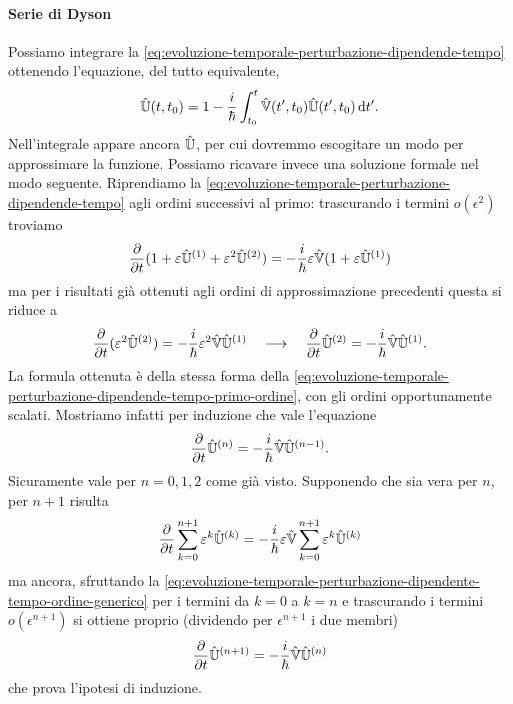 \paragraph{Serie di Dyson}
Possiamo integrare la \eqref{eq:evoluzione-temporale-perturbazione-dipendende-tempo} ottenendo l'equazione, del tutto equivalente,
\begin{equation}
	\hat{\mathbb U}(t,t_0)=1-\frac{i}{\hbar}\int_{t_0}^t\hat{\mathbb V}(t',t_0)\hat{\mathbb U}(t',t_0)\,\textup{d} t'.
	\label{eq:evoluzione-temporale-perturbazione-dipendente-tempo-integrata}
\end{equation}
Nell'integrale appare ancora $\hat{\mathbb U}$, per cui dovremmo escogitare un modo per approssimare la funzione.
Possiamo ricavare invece una soluzione formale nel modo seguente.
Riprendiamo la \eqref{eq:evoluzione-temporale-perturbazione-dipendende-tempo} agli ordini successivi al primo: trascurando i termini $o(\epsilon^2)$ troviamo
\begin{equation}
	\frac{\partial {}}{\partial {t}}(1+\varepsilon\hat{\mathbb U}^{(1)}+\varepsilon^2\hat{\mathbb U}^{(2)})=-\frac{i}{\hbar}\varepsilon\hat{\mathbb V}(1+\varepsilon\hat{\mathbb U}^{(1)})
\end{equation}
ma per i risultati già ottenuti agli ordini di approssimazione precedenti questa si riduce a
\begin{equation}
	\frac{\partial {}}{\partial {t}}(\varepsilon^2\hat{\mathbb U}^{(2)})=-\frac{i}{\hbar}\varepsilon^2\hat{\mathbb V}\hat{\mathbb U}^{(1)}
	\quad\longrightarrow\quad
	\frac{\partial {}}{\partial {t}}\hat{\mathbb U}^{(2)}=-\frac{i}{\hbar}\hat{\mathbb V}\hat{\mathbb U}^{(1)}.
	\label{eq:evoluzione-temporale-perturbazione-dipendente-tempo-secondo-ordine}
\end{equation}
La formula ottenuta è della stessa forma della \eqref{eq:evoluzione-temporale-perturbazione-dipendende-tempo-primo-ordine}, con gli ordini opportunamente scalati.
Mostriamo infatti per induzione che vale l'equazione
\begin{equation}
	\frac{\partial {}}{\partial {t}}\hat{\mathbb U}^{(n)}=-\frac{i}{\hbar}\hat{\mathbb V}\hat{\mathbb U}^{(n-1)}.
	\label{eq:evoluzione-temporale-perturbazione-dipendente-tempo-ordine-generico}
\end{equation}
Sicuramente vale per $n=0,1,2$ come già visto.
Supponendo che sia vera per $n$, per $n+1$ risulta
\begin{equation}
	\frac{\partial {}}{\partial {t}}\sum_{k=0}^{n+1}\varepsilon^k\hat{\mathbb U}^{(k)}=-\frac{i}{\hbar}\varepsilon\hat{\mathbb V}\sum_{k=0}^{n+1}\varepsilon^k\hat{\mathbb U}^{(k)}
\end{equation}
ma ancora, sfruttando la \eqref{eq:evoluzione-temporale-perturbazione-dipendente-tempo-ordine-generico} per i termini da $k=0$ a $k=n$ e trascurando i termini $o(\epsilon^{n+1})$ si ottiene proprio (dividendo per $\epsilon^{n+1}$ i due membri)
\begin{equation}
	\frac{\partial {}}{\partial {t}}\hat{\mathbb U}^{(n+1)}=-\frac{i}{\hbar}\hat{\mathbb V}\hat{\mathbb U}^{(n)}
\end{equation}
che prova l'ipotesi di induzione.

